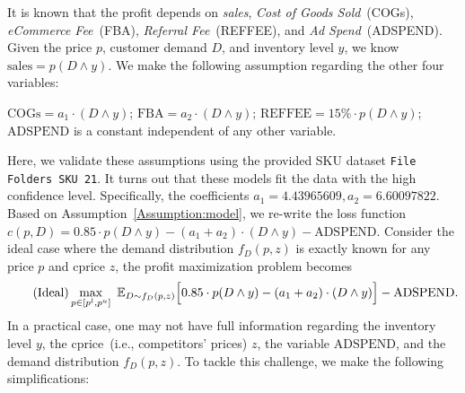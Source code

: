 \documentclass[competition,nonblindrev, 12pt]{informs3-competition}
\theoremstyle{TH}%
\theoremstyle{TH}%
\begin{document}
It is known that the profit depends on \emph{sales}, \emph{Cost of Goods Sold}~(COGs), \emph{eCommerce Fee}~(FBA), \emph{Referral Fee}~(REFFEE), and \emph{Ad Spend}~(ADSPEND). 
Given the price $p$, customer demand $D$, and inventory level $y$, we know $\mathrm{sales}=p(D\land y)$.
We make the following assumption regarding the other four variables:
\vspace{-0.5em}
\begin{assumption}\label{Assumption:model}
$\mathrm{COGs} = a_1\cdot(D\land y)$;
$\mathrm{FBA} = a_2\cdot(D\land y)$;
$\mathrm{REFFEE} =15\%\cdot p(D\land y)$;
$\mathrm{ADSPEND}$ is a constant independent of any other variable.
\end{assumption} 
\vspace{-0.5em}
Here, we validate these assumptions using the provided SKU dataset \texttt{File Folders SKU 21}.
It turns out that these models fit the data with the high confidence level.
Specifically, the coefficients $a_1=4.43965609, a_2=6.60097822$.
Based on Assumption~\ref{Assumption:model}, we re-write the loss function 
$c(p,D)=0.85\cdot p(D\land y) - (a_1+a_2)\cdot (D\land y) - \text{ADSPEND}.$
Consider the ideal case where the demand distribution $f_D(p,z)$ is exactly known for any price $p$ and cprice $z$, the profit maximization problem becomes\vspace{-0.5em}
\begin{equation}\label{Eq:true:loss}
\tag{Ideal}
\max_{p\in[p^l, p^u]}~\mathbb{E}_{D\sim f_D(p,z)}\Big[ 
0.85\cdot p(D\land y) - (a_1+a_2)\cdot (D\land y) 
\Big] - \mathrm{ADSPEND}.\vspace{-0.5em}
\end{equation}
In a practical case, one may not have full information regarding the inventory level $y$, the cprice~(i.e., competitors' prices) $z$, the variable $\mathrm{ADSPEND}$, and the demand distribution $f_D(p,z)$.
To tackle this challenge, we make the following simplifications:
\end{document}
